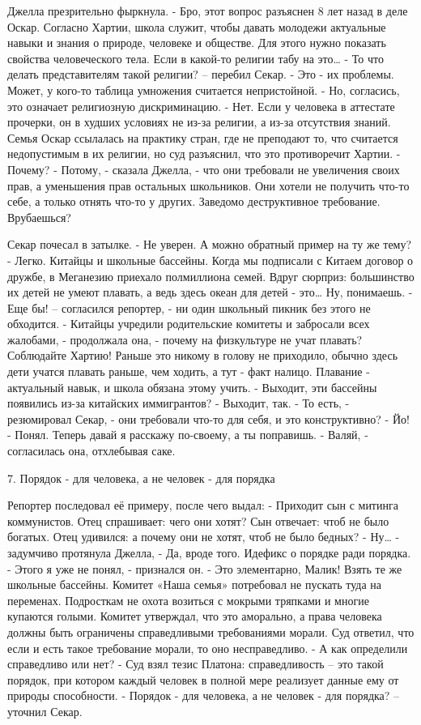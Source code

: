 \documentclass{book}
\begin{document}
Джелла презрительно фыркнула.
- Бро, этот вопрос разъяснен 8 лет назад в деле Оскар. Согласно Хартии, школа служит, чтобы давать молодежи актуальные навыки и знания о природе, человеке и обществе. Для этого нужно показать свойства человеческого тела. Если в какой-то религии табу на это\ldots{}
- То что делать представителям такой религии? -- перебил Секар.
- Это - их проблемы. Может, у кого-то таблица умножения считается непристойной.
- Но, согласись, это означает религиозную дискриминацию.
- Нет. Если у человека в аттестате прочерки, он в худших условиях не из-за религии, а из-за отсутствия знаний. Семья Оскар ссылалась на практику стран, где не преподают то, что считается недопустимым в их религии, но суд разъяснил, что это противоречит Хартии.
- Почему?
- Потому, - сказала Джелла, - что они требовали не увеличения своих прав, а уменьшения прав остальных школьников. Они хотели не получить что-то себе, а только отнять что-то у других. Заведомо деструктивное требование. Врубаешься?

Секар почесал в затылке.
- Не уверен. А можно обратный пример на ту же тему?
- Легко. Китайцы и школьные бассейны. Когда мы подписали с Китаем договор о дружбе, в Меганезию приехало полмиллиона семей. Вдруг сюрприз: большинство их детей не умеют плавать, а ведь здесь океан для детей - это\ldots{} Ну, понимаешь.
- Еще бы! -- согласился репортер, - ни один школьный пикник без этого не обходится.
- Китайцы учредили родительские комитеты и забросали всех жалобами, - продолжала она, - почему на физкультуре не учат плавать? Соблюдайте Хартию! Раньше это никому в голову не приходило, обычно здесь дети учатся плавать раньше, чем ходить, а тут - факт налицо. Плавание - актуальный навык, и школа обязана этому учить.
- Выходит, эти бассейны появились из-за китайских иммигрантов?
- Выходит, так.
- То есть, - резюмировал Секар, - они требовали что-то для себя, и это конструктивно?
- Йо!
- Понял. Теперь давай я расскажу по-своему, а ты поправишь.
- Валяй, - согласилась она, отхлебывая саке.



7. Порядок - для человека, а не человек - для порядка


Репортер последовал её примеру, после чего выдал:
- Приходит сын с митинга коммунистов. Отец спрашивает: чего они хотят? Сын отвечает: чтоб не было богатых. Отец удивился: а почему они не хотят, чтоб не было бедных?
- Ну\ldots{} - задумчиво протянула Джелла, - Да, вроде того. Идефикс о порядке ради порядка.
- Этого я уже не понял, - признался он.
- Это элементарно, Малик! Взять те же школьные бассейны. Комитет «Наша семья» потребовал не пускать туда на переменах. Подросткам не охота возиться с мокрыми тряпками и многие купаются голыми. Комитет утверждал, что это аморально, а права человека должны быть ограничены справедливыми требованиями морали. Суд ответил, что если и есть такое требование морали, то оно несправедливо.
- А как определили справедливо или нет?
- Суд взял тезис Платона: справедливость -- это такой порядок, при котором каждый человек в полной мере реализует данные ему от природы способности.
- Порядок - для человека, а не человек - для порядка? -- уточнил Секар.
\end{document}

